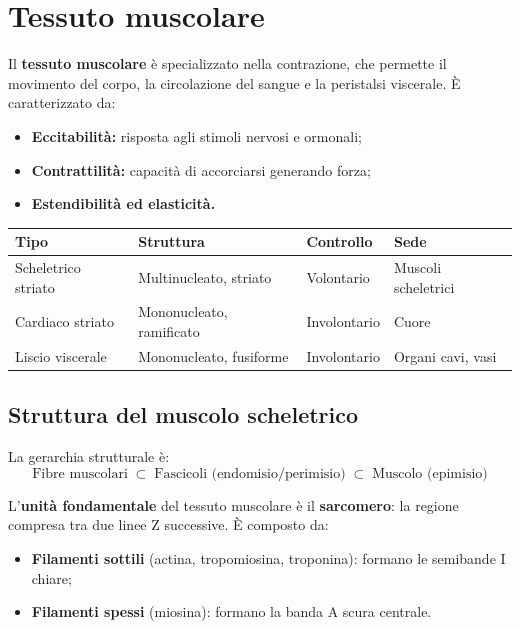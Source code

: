 \documentclass[11pt,a4paper,openright,twoside]{book}
\theoremstyle{definition}
\theoremstyle{plain}
\theoremstyle{remark}
\begin{document}
\section{Tessuto muscolare}

Il \textbf{tessuto muscolare} è specializzato nella contrazione, che permette il movimento del corpo, la circolazione del sangue e la peristalsi viscerale. È caratterizzato da:
\begin{itemize}
  \item \textbf{Eccitabilità:} risposta agli stimoli nervosi e ormonali;
  \item \textbf{Contrattilità:} capacità di accorciarsi generando forza;
  \item \textbf{Estendibilità ed elasticità.}
\end{itemize}

\begin{center}
\begin{tabular}{llll}
\toprule
\textbf{Tipo} & \textbf{Struttura} & \textbf{Controllo} & \textbf{Sede} \\
\midrule
Scheletrico striato & Multinucleato, striato & Volontario & Muscoli scheletrici \\
Cardiaco striato & Mononucleato, ramificato & Involontario & Cuore \\
Liscio viscerale & Mononucleato, fusiforme & Involontario & Organi cavi, vasi \\
\bottomrule
\end{tabular}
\end{center}

\subsection{Struttura del muscolo scheletrico}

La gerarchia strutturale è:
\[
\text{Fibre muscolari} \;\subset\; \text{Fascicoli (endomisio/perimisio)} \;\subset\; \text{Muscolo (epimisio)}
\]

L'\textbf{unità fondamentale} del tessuto muscolare è il \textbf{sarcomero}: la regione compresa tra due linee Z successive. È composto da:
\begin{itemize}
  \item \textbf{Filamenti sottili} (actina, tropomiosina, troponina): formano le semibande I chiare;
  \item \textbf{Filamenti spessi} (miosina): formano la banda A scura centrale.
\end{itemize}
\end{document}
